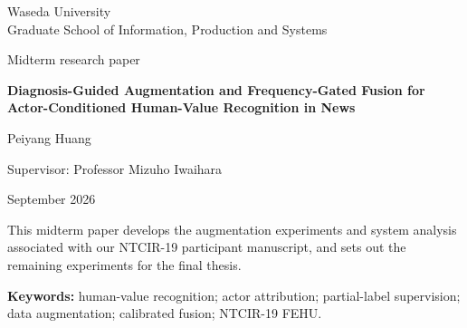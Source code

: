 \documentclass[12pt,a4paper]{article}
\begin{document}
\hypersetup{pageanchor=false}
\begin{titlepage}
\centering
\vspace*{22mm}
{\large Waseda University\\Graduate School of Information, Production and Systems\par}
\vspace{23mm}
{\Large Midterm research paper\par}
\vspace{14mm}
{\LARGE\bfseries Diagnosis-Guided Augmentation and Frequency-Gated Fusion for Actor-Conditioned Human-Value Recognition in News\par}
\vspace{22mm}
{\large Peiyang Huang\par}
\vspace{6mm}
{\large Supervisor: Professor Mizuho Iwaihara\par}
\vfill
{\large September 2026\par}
\vspace{10mm}
\begin{minipage}{0.88\textwidth}\small
This midterm paper develops the augmentation experiments and system analysis associated with our NTCIR-19 participant manuscript, and sets out the remaining experiments for the final thesis.
\end{minipage}
\end{titlepage}
\hypersetup{pageanchor=true}
\begin{abstract}
News reports often describe actions whose implications for human values are left implicit. Recognizing these values can help analyze how individuals and institutions are portrayed through their reported conduct. Such analysis requires attention to the actor and the surrounding events, because the same report may involve people or organizations with different roles and interests. NTCIR-19 FEHU (Fact-based Event-centric Human-value Understanding) aims to evaluate systems that identify values associated with specific actors in factual news and determine whether their reported conduct aligns with or contradicts those values. This paper focuses only on Task~1, which requires value recognition at the article level for a supplied set of actors.

The study addresses limited supervision for infrequent labels, along with false positives and direction errors when expanding prediction coverage. DRA-FEHU uses error diagnosis to guide the generation of additional training examples. It compares two ways of handling unspecified labels: treating them as negative or masking them during training. For inference, WAIPS-02 combines majority voting across prompts with separate direction arbitration. WAIPS-03 first segments each article to obtain initial value predictions. It then uses frequency-gated fusion to revise these predictions with auxiliary prompt outputs and encoder scores, and checks selected disagreements about direction.
\end{abstract}
\vspace{8pt}
\noindent\textbf{Keywords:} human-value recognition; actor attribution; partial-label supervision; data augmentation; calibrated fusion; NTCIR-19 FEHU.
\tableofcontents
\clearpage
{}
\end{document}
